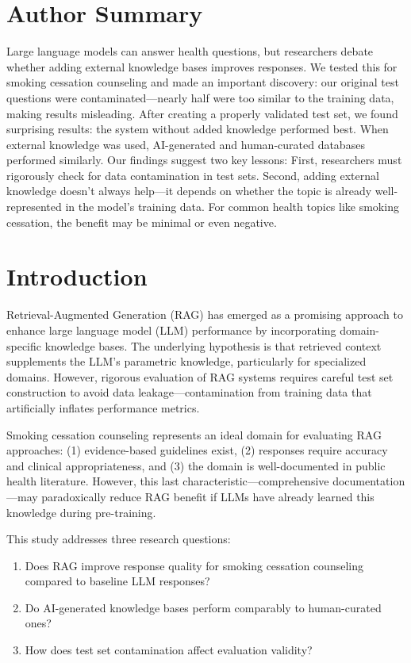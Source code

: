 \documentclass[10pt,letterpaper]{article}
\begin{document}
\section*{Author Summary}
Large language models can answer health questions, but researchers debate whether adding external knowledge bases improves responses. We tested this for smoking cessation counseling and made an important discovery: our original test questions were contaminated—nearly half were too similar to the training data, making results misleading. After creating a properly validated test set, we found surprising results: the system without added knowledge performed best. When external knowledge was used, AI-generated and human-curated databases performed similarly. Our findings suggest two key lessons: First, researchers must rigorously check for data contamination in test sets. Second, adding external knowledge doesn't always help—it depends on whether the topic is already well-represented in the model's training data. For common health topics like smoking cessation, the benefit may be minimal or even negative.

\section*{Introduction}
Retrieval-Augmented Generation (RAG) has emerged as a promising approach to enhance large language model (LLM) performance by incorporating domain-specific knowledge bases\cite{lewis2020retrieval}. The underlying hypothesis is that retrieved context supplements the LLM's parametric knowledge, particularly for specialized domains. However, rigorous evaluation of RAG systems requires careful test set construction to avoid data leakage—contamination from training data that artificially inflates performance metrics.

Smoking cessation counseling represents an ideal domain for evaluating RAG approaches: (1) evidence-based guidelines exist\cite{fiore2008treating}, (2) responses require accuracy and clinical appropriateness, and (3) the domain is well-documented in public health literature. However, this last characteristic—comprehensive documentation—may paradoxically reduce RAG benefit if LLMs have already learned this knowledge during pre-training.

This study addresses three research questions:
\begin{enumerate}
    \item Does RAG improve response quality for smoking cessation counseling compared to baseline LLM responses?
    \item Do AI-generated knowledge bases perform comparably to human-curated ones?
    \item How does test set contamination affect evaluation validity?
\end{enumerate}
\end{document}
